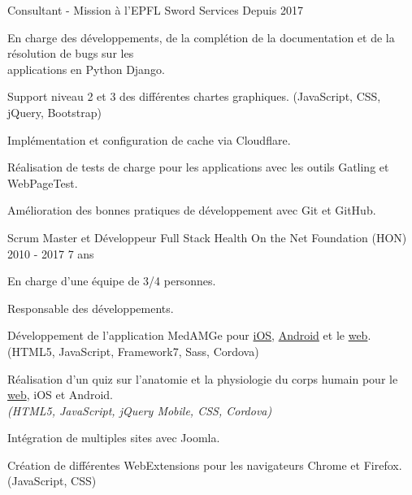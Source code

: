 
\begin{cventries}

  \cventry
    {Consultant - Mission à l'EPFL}
    {Sword Services}
    {Depuis 2017}
    {}
    {
      \begin{cvitems}
        \item En charge des développements, de la complétion de la
          documentation et de la résolution de bugs sur les \\applications en
          Python Django.
        \item Support niveau 2 et 3 des différentes chartes graphiques.
          (JavaScript, CSS, jQuery, Bootstrap)
        \item Implémentation et configuration de cache via Cloudflare.
        \item Réalisation de tests de charge pour les applications avec
          les outils Gatling et WebPageTest.
        \item Amélioration des bonnes pratiques de développement avec Git et
          GitHub.
      \end{cvitems}
    }

  \cventry
    {Scrum Master et Développeur Full Stack}
    {Health On the Net Foundation (HON)}
    {2010 - 2017}
    {7 ans}
    {
      \begin{cvitems}
        \item En charge d'une équipe de 3/4 personnes.
        \item Responsable des développements.
        \item Développement de l'application MedAMGe pour
          {\color{awesome-skyblue}
            \href{https://itunes.apple.com/us/app/medamge/id469762154?mt=8}{iOS}},
          {\color{awesome-skyblue}
            \href{https://play.google.com/store/apps/details?id=org.healthonnet.medamge.android&hl=en}{Android}}
          et le
          {\color{awesome-skyblue}
            \href{https://www.medamge.ch}{web}}.
            (HTML5, JavaScript, Framework7, Sass, Cordova)
        \item Réalisation d'un quiz sur l'anatomie et la physiologie du corps
          humain pour le
          {\color{awesome-skyblue}
            \href{https://www.santeromande.ch/Game/}{web}}, iOS et Android.\\
          \textit{(HTML5, JavaScript, jQuery Mobile, CSS, Cordova)}
        \item Intégration de multiples sites avec Joomla.
        \item Création de différentes WebExtensions pour les navigateurs
          Chrome et Firefox. (JavaScript, CSS)
      \end{cvitems}
    }


\end{cventries}
